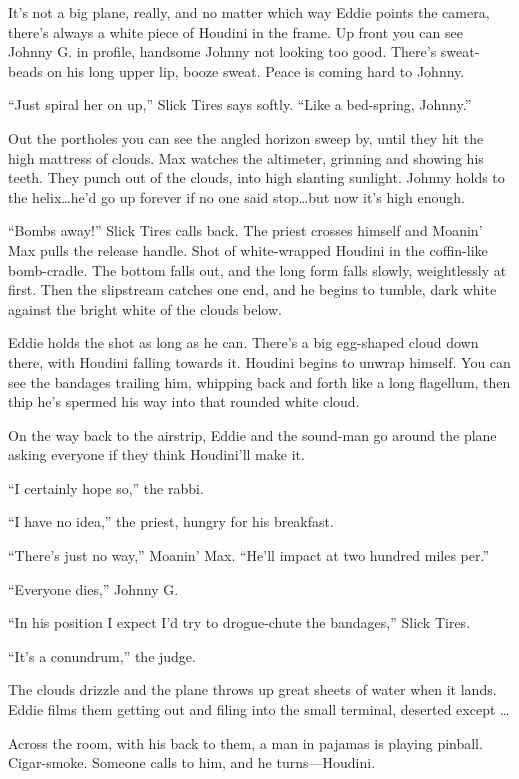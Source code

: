 It’s not a big plane, really, and no matter which way Eddie points the camera, there’s always a white piece of Houdini in the frame. Up front you can see Johnny G. in profile, handsome Johnny not looking too good. There’s sweat-beads on his long upper lip, booze sweat. Peace is coming hard to Johnny.

“Just spiral her on up,” Slick Tires says softly. “Like a bed-spring, Johnny.”

Out the portholes you can see the angled horizon sweep by, until they hit the high mattress of clouds. Max watches the altimeter, grinning and showing his teeth. They punch out of the clouds, into high slanting sunlight. Johnny holds to the helix…he’d go up forever if no one said stop…but now it’s high enough.

“Bombs away!” Slick Tires calls back. The priest crosses himself and Moanin’ Max pulls the release handle. Shot of white-wrapped Houdini in the coffin-like bomb-cradle. The bottom falls out, and the long form falls slowly, weightlessly at first. Then the slipstream catches one end, and he begins to tumble, dark white against the bright white of the clouds below.

Eddie holds the shot as long as he can. There’s a big egg-shaped cloud down there, with Houdini falling towards it. Houdini begins to unwrap himself. You can see the bandages trailing him, whipping back and forth like a long flagellum, then thip he’s spermed his way into that rounded white cloud.

On the way back to the airstrip, Eddie and the sound-man go around the plane asking everyone if they think Houdini’ll make it.

“I certainly hope so,” the rabbi.

“I have no idea,” the priest, hungry for his breakfast.

“There’s just no way,” Moanin’ Max. “He’ll impact at two hundred miles per.”

“Everyone dies,” Johnny G.

“In his position I expect I’d try to drogue-chute the bandages,” Slick Tires.

“It’s a conundrum,” the judge.

The clouds drizzle and the plane throws up great sheets of water when it lands. Eddie films them getting out and filing into the small terminal, deserted except …

Across the room, with his back to them, a man in pajamas is playing pinball. Cigar-smoke. Someone calls to him, and he turns—Houdini.

